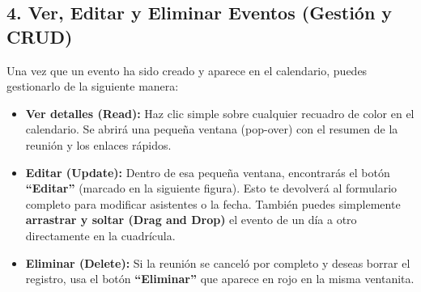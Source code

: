 \subsection{4. Ver, Editar y Eliminar Eventos (Gestión y CRUD)}

Una vez que un evento ha sido creado y aparece en el calendario, puedes gestionarlo de la siguiente manera:

\begin{itemize}
    \item \textbf{Ver detalles (Read):} Haz clic simple sobre cualquier recuadro de color en el calendario. Se abrirá una pequeña ventana (pop-over) con el resumen de la reunión y los enlaces rápidos.
    \item \textbf{Editar (Update):} Dentro de esa pequeña ventana, encontrarás el botón \textbf{``Editar''} (marcado en la siguiente figura). Esto te devolverá al formulario completo para modificar asistentes o la fecha. También puedes simplemente \textbf{arrastrar y soltar (Drag and Drop)} el evento de un día a otro directamente en la cuadrícula.
    \item \textbf{Eliminar (Delete):} Si la reunión se canceló por completo y deseas borrar el registro, usa el botón \textbf{``Eliminar''} que aparece en rojo en la misma ventanita.
\end{itemize}
